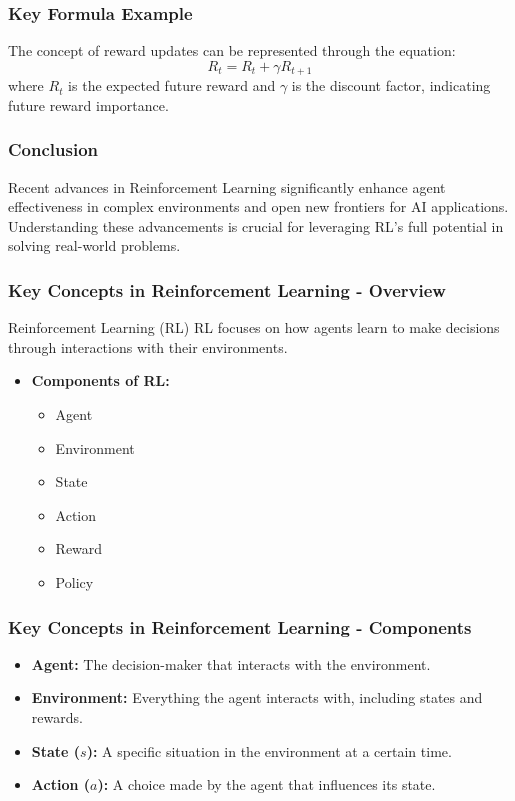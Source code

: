 \documentclass[aspectratio=169]{beamer}
\begin{document}
\begin{frame}[fragile]
    \frametitle{Key Formula Example}
    The concept of reward updates can be represented through the equation:
    \begin{equation}
        R_t = R_t + \gamma R_{t+1}
    \end{equation}
    where \( R_t \) is the expected future reward and \( \gamma \) is the discount factor, indicating future reward importance.
\end{frame}

\begin{frame}[fragile]
    \frametitle{Conclusion}
    Recent advances in Reinforcement Learning significantly enhance agent effectiveness in complex environments and open new frontiers for AI applications. 
    Understanding these advancements is crucial for leveraging RL's full potential in solving real-world problems.
\end{frame}

\begin{frame}[fragile]
    \frametitle{Key Concepts in Reinforcement Learning - Overview}
    \begin{block}{Reinforcement Learning (RL)}
        RL focuses on how agents learn to make decisions through interactions with their environments.
    \end{block}
    \begin{itemize}
        \item \textbf{Components of RL:}
        \begin{itemize}
            \item Agent
            \item Environment
            \item State
            \item Action
            \item Reward
            \item Policy
        \end{itemize}
    \end{itemize}
\end{frame}

\begin{frame}[fragile]
    \frametitle{Key Concepts in Reinforcement Learning - Components}
    \begin{itemize}
        \item \textbf{Agent:} The decision-maker that interacts with the environment.
        \item \textbf{Environment:} Everything the agent interacts with, including states and rewards.
        \item \textbf{State ($s$):} A specific situation in the environment at a certain time.
        \item \textbf{Action ($a$):} A choice made by the agent that influences its state.
    \end{itemize}
\end{frame}
\end{document}
